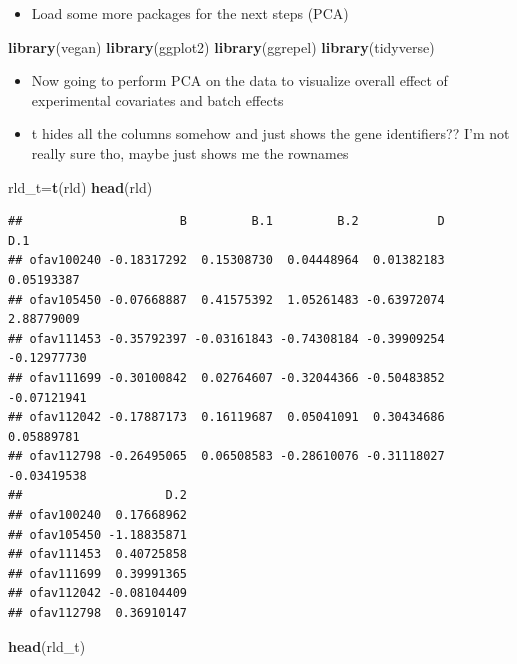 \documentclass[
]{article}
\newenvironment{Shaded}{\begin{snugshade}}{\end{snugshade}}
\newcommand{\KeywordTok}[1]{\textcolor[rgb]{0.13,0.29,0.53}{\textbf{#1}}}
\newcommand{\NormalTok}[1]{#1}
\providecommand{\tightlist}{%
  \setlength{\itemsep}{0pt}\setlength{\parskip}{0pt}}
\begin{document}
\begin{itemize}
\tightlist
\item
  Load some more packages for the next steps (PCA)
\end{itemize}

\begin{Shaded}
\begin{Highlighting}[]
\KeywordTok{library}\NormalTok{(vegan)}
\KeywordTok{library}\NormalTok{(ggplot2)}
\KeywordTok{library}\NormalTok{(ggrepel)}
\KeywordTok{library}\NormalTok{(tidyverse)}
\end{Highlighting}
\end{Shaded}

\begin{itemize}
\tightlist
\item
  Now going to perform PCA on the data to visualize overall effect of
  experimental covariates and batch effects
\item
  t hides all the columns somehow and just shows the gene identifiers??
  I'm not really sure tho, maybe just shows me the rownames
\end{itemize}

\begin{Shaded}
\begin{Highlighting}[]
\NormalTok{rld_t=}\KeywordTok{t}\NormalTok{(rld)}
\KeywordTok{head}\NormalTok{(rld)}
\end{Highlighting}
\end{Shaded}

\begin{verbatim}
##                      B         B.1         B.2           D         D.1
## ofav100240 -0.18317292  0.15308730  0.04448964  0.01382183  0.05193387
## ofav105450 -0.07668887  0.41575392  1.05261483 -0.63972074  2.88779009
## ofav111453 -0.35792397 -0.03161843 -0.74308184 -0.39909254 -0.12977730
## ofav111699 -0.30100842  0.02764607 -0.32044366 -0.50483852 -0.07121941
## ofav112042 -0.17887173  0.16119687  0.05041091  0.30434686  0.05889781
## ofav112798 -0.26495065  0.06508583 -0.28610076 -0.31118027 -0.03419538
##                    D.2
## ofav100240  0.17668962
## ofav105450 -1.18835871
## ofav111453  0.40725858
## ofav111699  0.39991365
## ofav112042 -0.08104409
## ofav112798  0.36910147
\end{verbatim}

\begin{Shaded}
\begin{Highlighting}[]
\KeywordTok{head}\NormalTok{(rld_t)}
\end{Highlighting}
\end{Shaded}
\end{document}
